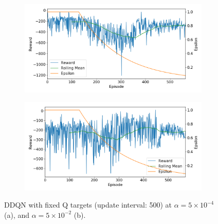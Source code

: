 \documentclass[10pt]{article}
\begin{document}
\begin{figure}[H]
  \centering
  \begin{subfigure}[b]{0.49\linewidth}
  \centering
  \includegraphics[width=\linewidth]{../logs/train_param_0083.png}
      \caption{}
  \label{fig:train_param_0083}
  \end{subfigure}
  \begin{subfigure}[b]{0.49\linewidth}
  \centering
  \includegraphics[width=\linewidth]{../logs/train_param_0084.png}
      \caption{}
  \label{fig:train_param_0084}
  \end{subfigure}
    \caption{DDQN with fixed Q targets (update interval: 500) at $\alpha=5\times 10^{-4}$ (a), and $\alpha=5\times 10^{-2}$ (b).}
  \label{fig:nnbestparam}
\end{figure}
  
\end{document}
